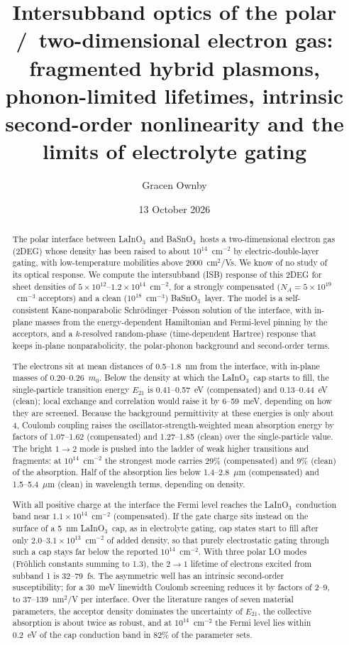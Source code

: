 \documentclass[11pt]{article}
\title{Intersubband optics of the polar \LIO/\BSO\ two-dimensional electron gas: fragmented hybrid plasmons, phonon-limited lifetimes, intrinsic second-order nonlinearity and the limits of electrolyte gating}
\author{Gracen Ownby}
\affil{University of Oklahoma, Norman, Oklahoma, USA}
\date{\small 13 October 2026}
\newcommand{\LIO}{\texorpdfstring{LaInO$_3$}{LaInO3}}
\newcommand{\BSO}{\texorpdfstring{BaSnO$_3$}{BaSnO3}}
\begin{document}
\maketitle

\begin{abstract}
The polar interface between \LIO\ and \BSO\ hosts a two-dimensional electron gas (2DEG) whose density has been raised to about $10^{14}$~cm$^{-2}$ by electric-double-layer gating, with low-temperature mobilities above 2000~cm$^2$/Vs. We know of no study of its optical response. We compute the intersubband (ISB) response of this 2DEG for sheet densities of $5\times10^{12}$--$1.2\times10^{14}$~cm$^{-2}$, for a strongly compensated ($N_A=5\times10^{19}$~cm$^{-3}$ acceptors) and a clean ($10^{18}$~cm$^{-3}$) \BSO\ layer. The model is a self-consistent Kane-nonparabolic Schr\"odinger--Poisson solution of the interface, with in-plane masses from the energy-dependent Hamiltonian and Fermi-level pinning by the acceptors, and a $k$-resolved random-phase (time-dependent Hartree) response that keeps in-plane nonparabolicity, the polar-phonon background and second-order terms.

The electrons sit at mean distances of 0.5--1.8~nm from the interface, with in-plane masses of 0.20--0.26~$m_0$. Below the density at which the \LIO\ cap starts to fill, the single-particle transition energy $E_{21}$ is 0.41--0.57~eV (compensated) and 0.13--0.44~eV (clean); local exchange and correlation would raise it by 6--59~meV, depending on how they are screened. Because the background permittivity at these energies is only about 4, Coulomb coupling raises the oscillator-strength-weighted mean absorption energy by factors of 1.07--1.62 (compensated) and 1.27--1.85 (clean) over the single-particle value. The bright $1\to2$ mode is pushed into the ladder of weak higher transitions and fragments: at $10^{14}$~cm$^{-2}$ the strongest mode carries 29\% (compensated) and 9\% (clean) of the absorption. Half of the absorption lies below 1.4--2.8~$\mu$m (compensated) and 1.5--5.4~$\mu$m (clean) in wavelength terms, depending on density.

With all positive charge at the interface the Fermi level reaches the \LIO\ conduction band near $1.1\times10^{14}$~cm$^{-2}$ (compensated). If the gate charge sits instead on the surface of a 5~nm \LIO\ cap, as in electrolyte gating, cap states start to fill after only $2.0$--$3.1\times10^{13}$~cm$^{-2}$ of added density, so that purely electrostatic gating through such a cap stays far below the reported $10^{14}$~cm$^{-2}$. With three polar LO modes (Fr\"ohlich constants summing to 1.3), the $2\to1$ lifetime of electrons excited from subband 1 is 32--79~fs. The asymmetric well has an intrinsic second-order susceptibility; for a 30~meV linewidth Coulomb screening reduces it by factors of 2--9, to 37--139~nm$^2$/V per interface. Over the literature ranges of seven material parameters, the acceptor density dominates the uncertainty of $E_{21}$, the collective absorption is about twice as robust, and at $10^{14}$~cm$^{-2}$ the Fermi level lies within 0.2~eV of the cap conduction band in 82\% of the parameter sets.
\end{abstract}
\end{document}
